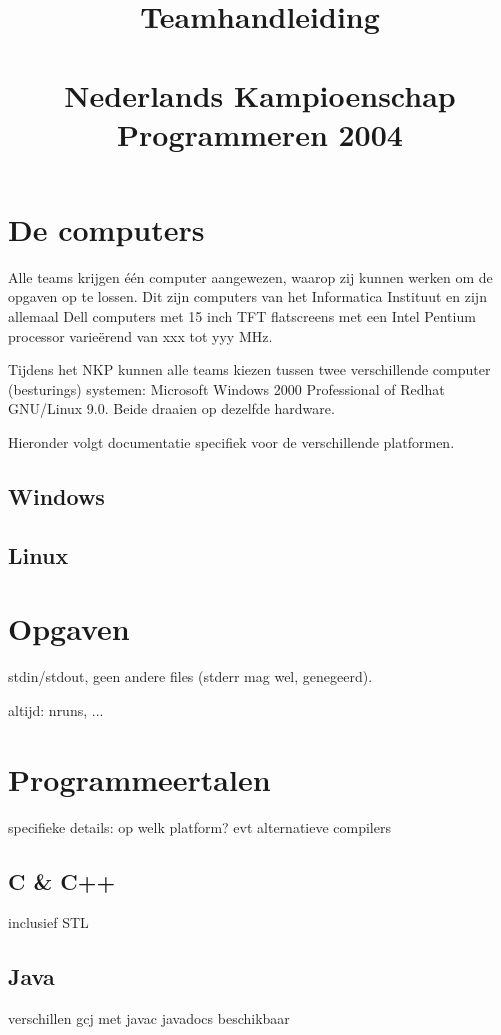 \documentclass[11pt,titlepage,a4paper]{article}
\title{Teamhandleiding\\~\\Nederlands Kampioenschap Programmeren 2004}
\begin{document}
\maketitle

\tableofcontents
\newpage


\section{De computers}

Alle teams krijgen \'e\'en computer aangewezen, waarop zij kunnen
werken om de opgaven op te lossen. Dit zijn computers van het
Informatica Instituut en zijn allemaal Dell computers met 15 inch TFT
flatscreens met een Intel Pentium processor varie\"erend van xxx tot
yyy MHz.

Tijdens het NKP kunnen alle teams kiezen tussen twee verschillende
computer (besturings) systemen: Microsoft Windows 2000 Professional of
Redhat GNU/Linux 9.0. Beide draaien op dezelfde hardware.

Hieronder volgt documentatie specifiek voor de verschillende platformen.

\subsection{Windows}
\subsection{Linux}


\section{Opgaven}

stdin/stdout, geen andere files (stderr mag wel, genegeerd).

altijd: nruns, ...


\section{Programmeertalen}

specifieke details:
op welk platform?
evt alternatieve compilers

\subsection{C \& C++}
inclusief STL

\subsection{Java}
verschillen gcj met javac
javadocs beschikbaar
\end{document}
